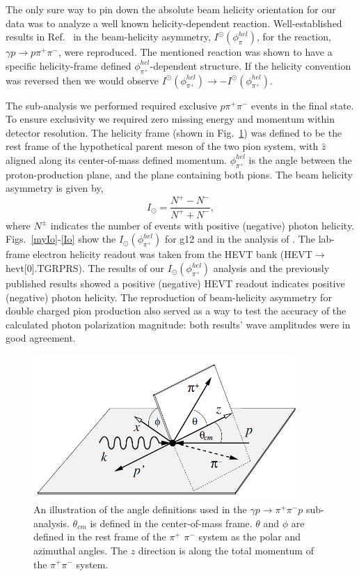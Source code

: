 The only sure way to pin down the absolute beam helicity orientation for our data was to analyze a well known helicity-dependent reaction. Well-established results in Ref.~\cite{Io} in the beam-helicity asymmetry, $I^\odot(\phi^{hel}_\pi)$, for the reaction, $\gamma p \to p \pi^+ \pi^-$, were reproduced.  The mentioned reaction was shown to have a specific helicity-frame defined $\phi^{hel}_{\pi^+}$-dependent structure.  If the helicity convention was reversed then we would observe $I^\odot(\phi^{hel}_{\pi^+}) \to -I^\odot(\phi^{hel}_{\pi^+})$.

The sub-analysis we performed required exclusive $p \pi^+ \pi^-$ events in the final state. To ensure exclusivity we required zero missing energy and momentum within detector resolution. The helicity frame (shown in Fig.~\ref{ioplane}) was defined to be the rest frame of the hypothetical parent meson of the two pion system, with  $\hat{z}$ aligned along its center-of-mass defined momentum. $\phi^{hel}_{\pi^+}$ is the angle between the proton-production plane, and the plane containing both pions. The beam helicity asymmetry is given by,
\begin{equation}
I_\odot = \frac{N^+ - N^-}{N^+ + N^-},
\end{equation}
where $N^\pm$ indicates the number of events with positive (negative) photon helicity.  Figs.~\ref{myIo}-\ref{Io} show the $I_{\odot}(\phi^{hel}_{\pi^+})$ for g12 and in the analysis of \cite{Io}.
The lab-frame electron helicity readout was taken from the HEVT bank (HEVT$\to$hevt[0].TGRPRS). The results of our $I_{\odot}(\phi^{hel}_{\pi^+})$ analysis and the previously published results showed a positive (negative) HEVT readout indicates positive (negative) photon helicity. The reproduction of beam-helicity asymmetry for double charged pion production also served as a way to test the accuracy of the calculated photon polarization magnitude: both results' wave amplitudes were in good agreement.

\begin{figure}[h]
\begin{center}
 \includegraphics[width=0.9\textwidth]{figures/calib/pol/ioplane.png}
  \caption{An illustration of the angle definitions used in the $\gamma p \to \pi^+ \pi^- p$ sub-analysis. $\theta_{cm}$ is defined in the center-of-mass frame. $\theta$ and $\phi$ are defined in the rest frame of the $\pi^+$ $\pi^-$ system as the polar and azimuthal angles. The $z$ direction is along the total momentum of the $\pi^+ \pi^-$ system.}
  \label{ioplane}
  \end{center}
\end{figure}


